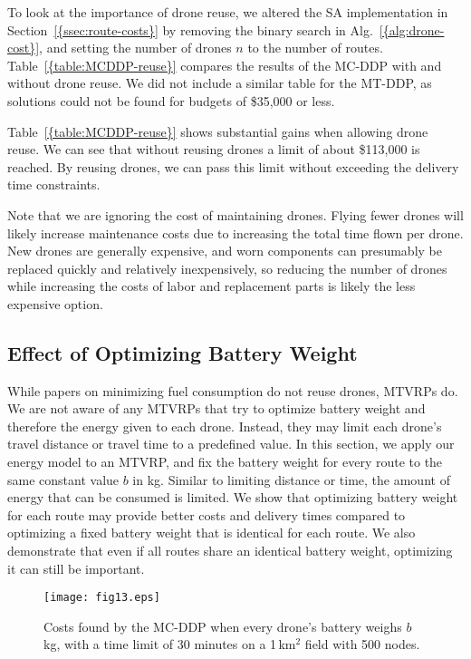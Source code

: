 \documentclass[journal]{IEEEtran}
\begin{document}
To look at the importance of drone reuse, we altered the SA implementation in {Section~\ref{{ssec:route-costs}}} by removing the binary search in {Alg.~\ref{{alg:drone-cost}}}, and setting the number of drones ${\ensuremath{n}}$ to the number of routes. {Table~\ref{{table:MCDDP-reuse}}} compares the results of the MC-DDP with and without drone reuse. We did not include a similar table for the MT-DDP, as solutions could not be found for budgets of \$35,000 or less. 

{Table~\ref{{table:MCDDP-reuse}}} shows substantial gains when allowing drone reuse. We can see that without reusing drones a limit of about \$113,000 is reached. By reusing drones, we can pass this limit without exceeding the delivery time constraints.

Note that we are ignoring the cost of maintaining drones. Flying fewer drones will likely increase maintenance costs due to increasing the total time flown per drone. New drones are generally expensive, and worn components can presumably be replaced quickly and relatively inexpensively, so reducing the number of drones while increasing the costs of labor and replacement parts is likely the less expensive option.

\subsection{Effect of Optimizing Battery Weight}
\label{ssec:battery-optimization}

While papers on minimizing fuel consumption do not reuse drones, MTVRPs do. We are not aware of any MTVRPs that try to optimize battery weight and therefore the energy given to each drone. Instead, they may limit each drone's travel distance or travel time to a predefined value. In this section, we apply our energy model to an MTVRP, and fix the battery weight for every route to the same constant value ${\ensuremath{b}}$ in kg. Similar to limiting distance or time, the amount of energy that can be consumed is limited. We show that optimizing battery weight for each route may provide better costs and delivery times compared to optimizing a fixed battery weight that is identical for each route. We also demonstrate that even if all routes share an identical battery weight, optimizing it can still be important.

\begin{figure}[t]
\centering
\texttt{[image: fig13.eps]}
\caption{Costs found by the MC-DDP when every drone's battery weighs ${\ensuremath{b}}$\,kg, with a time limit of 30 minutes on a 1\,km$^2$ field with 500 nodes.}
\label{fig:MCDDP-Weights}
\end{figure}
\end{document}
